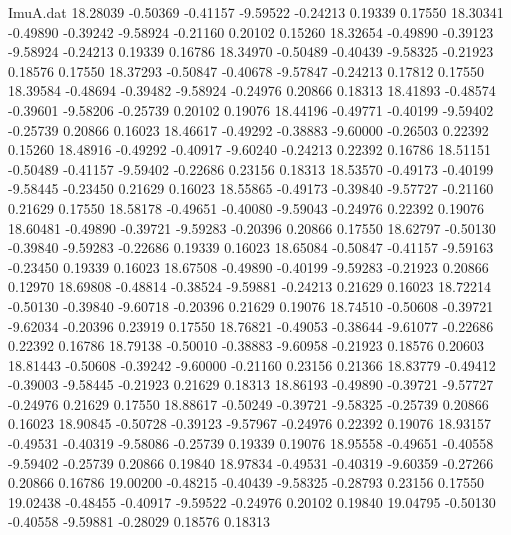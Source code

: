 \begin{filecontents}{ImuA.dat}
  18.28039   -0.50369   -0.41157   -9.59522   -0.24213    0.19339    0.17550
  18.30341   -0.49890   -0.39242   -9.58924   -0.21160    0.20102    0.15260
  18.32654   -0.49890   -0.39123   -9.58924   -0.24213    0.19339    0.16786
  18.34970   -0.50489   -0.40439   -9.58325   -0.21923    0.18576    0.17550
  18.37293   -0.50847   -0.40678   -9.57847   -0.24213    0.17812    0.17550
  18.39584   -0.48694   -0.39482   -9.58924   -0.24976    0.20866    0.18313
  18.41893   -0.48574   -0.39601   -9.58206   -0.25739    0.20102    0.19076
  18.44196   -0.49771   -0.40199   -9.59402   -0.25739    0.20866    0.16023
  18.46617   -0.49292   -0.38883   -9.60000   -0.26503    0.22392    0.15260
  18.48916   -0.49292   -0.40917   -9.60240   -0.24213    0.22392    0.16786
  18.51151   -0.50489   -0.41157   -9.59402   -0.22686    0.23156    0.18313
  18.53570   -0.49173   -0.40199   -9.58445   -0.23450    0.21629    0.16023
  18.55865   -0.49173   -0.39840   -9.57727   -0.21160    0.21629    0.17550
  18.58178   -0.49651   -0.40080   -9.59043   -0.24976    0.22392    0.19076
  18.60481   -0.49890   -0.39721   -9.59283   -0.20396    0.20866    0.17550
  18.62797   -0.50130   -0.39840   -9.59283   -0.22686    0.19339    0.16023
  18.65084   -0.50847   -0.41157   -9.59163   -0.23450    0.19339    0.16023
  18.67508   -0.49890   -0.40199   -9.59283   -0.21923    0.20866    0.12970
  18.69808   -0.48814   -0.38524   -9.59881   -0.24213    0.21629    0.16023
  18.72214   -0.50130   -0.39840   -9.60718   -0.20396    0.21629    0.19076
  18.74510   -0.50608   -0.39721   -9.62034   -0.20396    0.23919    0.17550
  18.76821   -0.49053   -0.38644   -9.61077   -0.22686    0.22392    0.16786
  18.79138   -0.50010   -0.38883   -9.60958   -0.21923    0.18576    0.20603
  18.81443   -0.50608   -0.39242   -9.60000   -0.21160    0.23156    0.21366
  18.83779   -0.49412   -0.39003   -9.58445   -0.21923    0.21629    0.18313
  18.86193   -0.49890   -0.39721   -9.57727   -0.24976    0.21629    0.17550
  18.88617   -0.50249   -0.39721   -9.58325   -0.25739    0.20866    0.16023
  18.90845   -0.50728   -0.39123   -9.57967   -0.24976    0.22392    0.19076
  18.93157   -0.49531   -0.40319   -9.58086   -0.25739    0.19339    0.19076
  18.95558   -0.49651   -0.40558   -9.59402   -0.25739    0.20866    0.19840
  18.97834   -0.49531   -0.40319   -9.60359   -0.27266    0.20866    0.16786
  19.00200   -0.48215   -0.40439   -9.58325   -0.28793    0.23156    0.17550
  19.02438   -0.48455   -0.40917   -9.59522   -0.24976    0.20102    0.19840
  19.04795   -0.50130   -0.40558   -9.59881   -0.28029    0.18576    0.18313

\end{filecontents}
